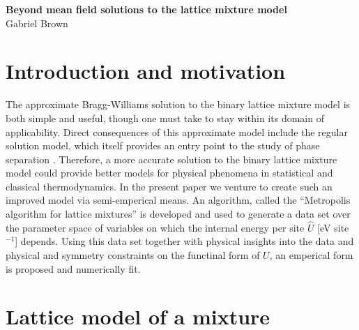 \documentclass[10pt]{article}
\begin{document}
\begin{center}
    \textbf{\large Beyond mean field solutions to the lattice mixture model} \\
    Gabriel Brown
\end{center}


\section{Introduction and motivation}
The approximate Bragg-Williams solution to the binary lattice mixture model is both simple and useful, though one must take to stay within its domain of applicability.
Direct consequences of this approximate model include the regular solution model, which itself provides an entry point to the study of phase separation \cite{dill}.
Therefore, a more accurate solution to the binary lattice mixture model could provide better models for physical phenomena in statistical and classical thermodynamics.
In the present paper we venture to create such an improved model via semi-emperical means.
An algorithm, called the ``Metropolis algorithm for lattice mixtures'' is developed and used to generate a data set over the parameter space of variables on which the internal energy per site $\hat{U}$ [eV site$^{-1}$] depends.
Using this data set together with physical insights into the data and physical and symmetry constraints on the functinal form of $U$, an emperical form is proposed and numerically fit.


\section{Lattice model of a mixture} 
\end{document}
